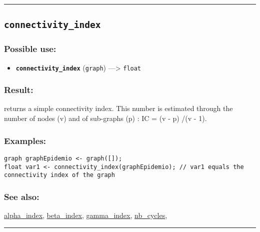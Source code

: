 \documentclass[]{book}
\providecommand{\tightlist}{%
  \setlength{\itemsep}{0pt}\setlength{\parskip}{0pt}}
\theoremstyle{definition}
\theoremstyle{definition}
\theoremstyle{definition}
\theoremstyle{remark}
\begin{document}
\begin{center}\rule{0.5\linewidth}{\linethickness}\end{center}

\subsection{\texorpdfstring{\texttt{connectivity\_index}}{connectivity\_index}}\label{connectivity_index}

\subsubsection{Possible use:}\label{possible-use-97}

\begin{itemize}
\tightlist
\item
  \textbf{\texttt{connectivity\_index}} (\texttt{graph})
  ---\textgreater{} \texttt{float}
\end{itemize}

\subsubsection{Result:}\label{result-95}

returns a simple connectivity index. This number is estimated through
the number of nodes (v) and of sub-graphs (p) : IC = (v - p) /(v - 1).

\subsubsection{Examples:}\label{examples-75}

\begin{verbatim}
graph graphEpidemio <- graph([]);  
float var1 <- connectivity_index(graphEpidemio); // var1 equals the connectivity index of the graph
\end{verbatim}

\subsubsection{See also:}\label{see-also-61}

\href{OperatorsAA\#alpha_index}{alpha\_index},
\href{OperatorsBC\#beta_index}{beta\_index},
\href{OperatorsDH\#gamma_index}{gamma\_index},
\href{OperatorsNR\#nb_cycles}{nb\_cycles},

\begin{center}\rule{0.5\linewidth}{\linethickness}\end{center}
\end{document}
